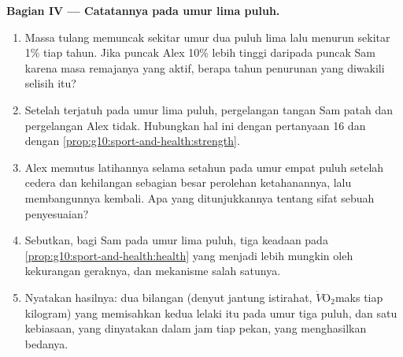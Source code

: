 \begin{problem}
\medskip
\noindent\textbf{Bagian IV --- Catatannya pada umur lima puluh.}
\begin{enumerate}[resume]
  \item Massa tulang memuncak sekitar umur dua puluh lima lalu menurun
        sekitar 1\% tiap tahun. Jika puncak Alex 10\% lebih tinggi
        daripada puncak Sam karena masa remajanya yang aktif, berapa
        tahun penurunan yang diwakili selisih itu?
  \item Setelah terjatuh pada umur lima puluh, pergelangan tangan Sam
        patah dan pergelangan Alex tidak. Hubungkan hal ini dengan
        pertanyaan 16 dan dengan
        \cref{prop:g10:sport-and-health:strength}.
  \item Alex memutus latihannya selama setahun pada umur empat puluh
        setelah cedera dan kehilangan sebagian besar perolehan
        ketahanannya, lalu membangunnya kembali. Apa yang ditunjukkannya
        tentang sifat sebuah penyesuaian?
  \item Sebutkan, bagi Sam pada umur lima puluh, tiga keadaan pada
        \cref{prop:g10:sport-and-health:health} yang menjadi lebih
        mungkin oleh kekurangan geraknya, dan mekanisme salah satunya.
  \item Nyatakan hasilnya: dua bilangan (denyut jantung istirahat,
        $\dot V\!\mathrm{O_2}$maks tiap kilogram) yang memisahkan kedua
        lelaki itu pada umur tiga puluh, dan satu kebiasaan, yang
        dinyatakan dalam jam tiap pekan, yang menghasilkan bedanya.
\end{enumerate}
\end{problem}
